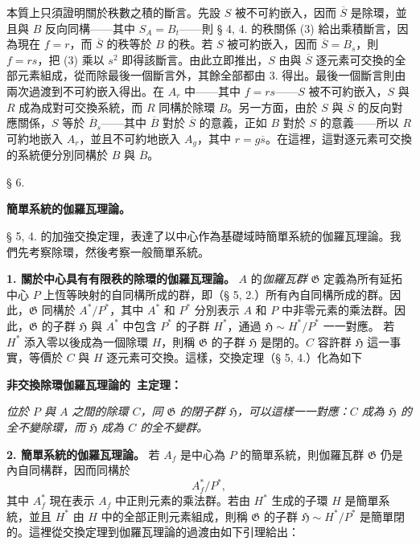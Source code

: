 \documentclass[11pt]{article}
\providecommand{\srcspaced}[1]{#1}
\providecommand{\Gcal}{\mathfrak G}
\begin{document}
本質上只須證明關於秩數之積的斷言。先設 \(S\) 被不可約嵌入，因而 \(\overline S\) 是除環，並且與 \(B\) 反向同構——其中 \(S_A=B_t\)——則 § 4, 4. 的秩關係 (3) 給出乘積斷言，因為現在 \(f=r\)，而 \(\overline S\) 的秩等於 \(B\) 的秩。若 \(S\) 被可約嵌入，因而 \(\overline S=B_s\)，則 \(f=rs\)，把 (3) 乘以 \(s^2\) 即得該斷言。由此立即推出，\(S\) 由與 \(\overline S\) 逐元素可交換的全部元素組成，從而除最後一個斷言外，其餘全部都由 3. 得出。最後一個斷言則由兩次過渡到不可約嵌入得出。在 \(A_r\) 中——其中 \(f=rs\)——\(S\) 被不可約嵌入，\(S\) 與 \(R\) 成為成對可交換系統，而 \(R\) 同構於除環 \(B\)。另一方面，由於 \(S\) 與 \(\overline S\) 的反向對應關係，\(S\) 等於 \(\overline B_s\)——其中 \(\overline B\) 對於 \(\overline S\) 的意義，正如 \(B\) 對於 \(S\) 的意義——所以 \(R\) 可約地嵌入 \(A_r\)，並且不可約地嵌入 \(A_g\)，其中 \(r=g\overline s\)。在這裡，這對逐元素可交換的系統便分別同構於 \(B\) 與 \(\overline B\)。

\begin{center}
§ 6.

\textbf{簡單系統的伽羅瓦理論。}
\end{center}

§ 5, 4. 的加強交換定理，表達了以中心作為基礎域時簡單系統的伽羅瓦理論。我們先考察除環，然後考察一般簡單系統。

\noindent\textbf{1. 關於中心具有有限秩的除環的伽羅瓦理論。} \(A\) 的\emph{伽羅瓦群} \(\Gcal\) 定義為所有延拓中心 \(P\) 上恆等映射的自同構所成的群，即（§ 5, 2.）所有內自同構所成的群。因此，\(\Gcal\) 同構於 \(A^*/P^*\)，其中 \(A^*\) 和 \(P^*\) 分別表示 \(A\) 和 \(P\) 中非零元素的乘法群。因此，\(\Gcal\) 的子群 \(\mathfrak H\) 與 \(A^*\) 中包含 \(P^*\) 的子群 \(H^*\)，通過 \(\mathfrak H\sim H^*/P^*\) 一一對應。
若 \(H^*\) 添入零以後成為一個除環 \(H\)，則稱 \(\Gcal\) 的子群 \(\mathfrak H\) 是閉的。\(C\) 容許群 \(\mathfrak H\) 這一事實，等價於 \(C\) 與 \(H\) 逐元素可交換。這樣，交換定理（§ 5, 4.）化為如下

\begin{center}
\textbf{\srcspaced{非交換除環伽羅瓦理論的}\
\srcspaced{主定理：}}
\end{center}

\emph{位於 \(P\) 與 \(A\) 之間的除環 \(C\)，同 \(\Gcal\) 的閉子群 \(\mathfrak H\)，可以這樣一一對應：\(C\) 成為 \(\mathfrak H\) 的全不變除環，而 \(\mathfrak H\) 成為 \(C\) 的全不變群。}

\noindent\textbf{\srcspaced{2. 簡單系統的伽羅瓦理論。}}
若 \(A_f\) 是中心為 \(P\) 的簡單系統，則伽羅瓦群 \(\Gcal\) 仍是內自同構群，因而同構於
\[
        A_f^*/P^*,
\]
其中 \(A_f^*\) 現在表示 \(A_f\) 中正則元素的乘法群。若由 \(H^*\) 生成的子環 \(H\) 是簡單系統，並且 \(H^*\) 由 \(H\) 中的全部正則元素組成，則稱 \(\Gcal\) 的子群 \(\mathfrak H\sim H^*/P^*\) 是簡單閉的。這裡從交換定理到伽羅瓦理論的過渡由如下引理給出：
\end{document}

